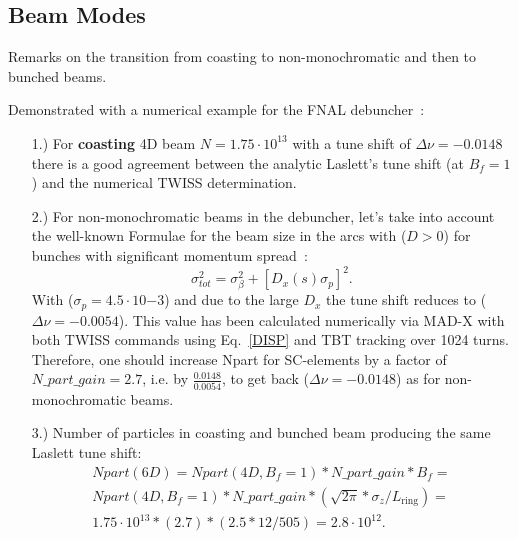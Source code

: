 \subsection{Beam Modes}
Remarks on the transition from coasting to non-monochromatic and then
to bunched beams.

Demonstrated with a numerical example for the FNAL
debuncher~\cite{KAPIN-I}:
\begin{itemize}
\item[1.)]  For {\bf coasting} 4D beam $N=1.75\cdot10^{13}$ with a
  tune shift of $\Delta\nu=-0.0148$ there is a good agreement between
  the analytic Laslett's tune shift (at $B_f=1$) and the numerical
  TWISS determination.

\item[2.)]  For non-monochromatic beams in the debuncher, let's take
  into account the well-known Formulae for the beam size in the arcs
  with ($D>0$) for bunches with significant momentum
  spread~\cite{MACKEY}:
  \begin{equation}\label{DISP}
    \sigma^2_{tot}= \sigma^2_\beta + [D_x(s) \sigma_p]^2.
  \end{equation}
  With ($\sigma_p=4.5\cdot10{-3}$) and due to the large $D_x$ the tune
  shift reduces to ($\Delta\nu=-0.0054$). This value has been
  calculated numerically via MAD-X with both TWISS commands using Eq.~\ref{DISP}
  and TBT tracking over 1024 turns. Therefore, one should increase
  Npart for SC-elements by a factor of $N\_part\_gain=2.7$, i.e. by
  $\frac{0.0148}{0.0054}$, to get back ($\Delta\nu=-0.0148$) as for
  non-monochromatic beams.
\item[3.)] Number of particles in coasting and bunched beam producing
  the same Laslett tune shift:
  \begin{equation}
    \begin{split}
      Npart(6D)= Npart(4D, B_f=1) * N\_part\_gain * B_f=\\ Npart(4D,
      B_f=1) * N\_part\_gain *
      (\sqrt{2\pi}*\sigma_z/L_{\textrm{ring}})=\\
1.75\cdot10^{13}*(2.7)*(2.5*12/505)=2.8\cdot10^{12}.
  \end{split}
  \end{equation}
\end{itemize}
